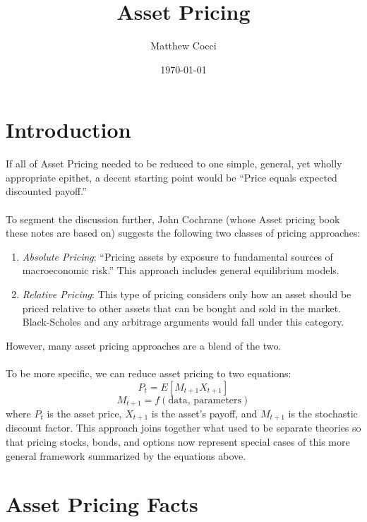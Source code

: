 \documentclass[a4paper,12pt]{scrartcl}
\author{Matthew Cocci}
\title{Asset Pricing}
\date{\today}
\begin{document}
\maketitle

\tableofcontents %

\newpage
\section{Introduction}

If all of Asset Pricing needed to be reduced to one simple,
general, yet wholly appropriate epithet, a decent starting
point would be ``Price equals expected discounted payoff.''
\\
\\
To segment the discussion further, John Cochrane (whose Asset pricing book
these notes are based on) suggests the following two classes of pricing
approaches:
\begin{enumerate}
    \item {\sl Absolute Pricing}: ``Pricing assets by exposure
	to fundamental sources of macroeconomic risk.'' This
	approach includes general equilibrium models. 
    \item {\sl Relative Pricing}: This type of pricing considers
	only how an asset should be priced relative to 
	other assets that can be bought and sold in the
	market. Black-Scholes and any arbitrage arguments
	would fall under this category.
\end{enumerate}
However, many asset pricing approaches are a blend of the two.
\\
\\
To be more specific, we can reduce asset pricing to two 
equations:
\begin{equation}
    P_t = E[M_{t+1} X_{t+1} ]
\end{equation}
\begin{equation}
    M_{t+1} = f(\text{data, parameters})
\end{equation}
where $P_t$ is the asset price, $X_{t+1}$ is the asset's payoff,
and $M_{t+1}$ is the stochastic discount factor.
This approach joins together what used to be separate theories so
that pricing stocks, bonds, and options now represent special
cases of this more general framework summarized by the equations above.


\section{Asset Pricing Facts}
\end{document}
